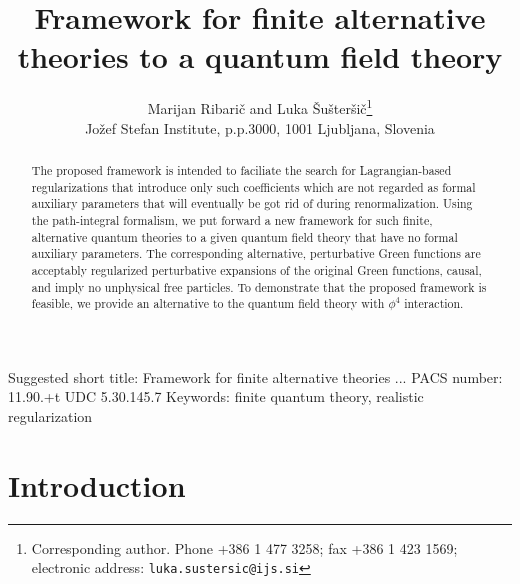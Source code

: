 \documentclass[a4paper,12pt]{article}
\title{Framework for finite alternative theories to a quantum field theory}
\author{Marijan Ribari\v c and Luka \v Su\v ster\v si\v c\thanks{Corresponding author. Phone +386 1 477 3258; fax +386 1 423 1569; electronic address: \tt luka.sustersic@ijs.si\rm} \\Jo\v zef Stefan Institute, p.p.3000, 1001 Ljubljana, Slovenia }
\date{}
\newcommand{\polje}{\phi}
\begin{document}
\maketitle

\begin{abstract}
The proposed framework is intended to faciliate the search for Lagrangian-based regularizations that introduce only such coefficients which are not regarded as formal auxiliary parameters that will eventually be got rid of during renormalization. Using the path-integral formalism, we put forward a new framework for such finite, alternative quantum theories to a given quantum field theory that have no formal auxiliary parameters. The corresponding alternative, perturbative Green functions are acceptably regularized perturbative expansions of the original Green functions, causal, and imply no unphysical free particles. To demonstrate that the proposed framework is feasible, we provide an alternative to the quantum field theory with $\polje^4$ interaction.
\end{abstract}


\vfill
Suggested short title: Framework for finite alternative theories ...
\vfill
PACS number: 11.90.+t \hfill UDC 5.30.145.7
\vfill
Keywords: finite quantum theory, realistic regularization
\vfill\eject

\section{Introduction}
\label{secintro}
\end{document}
